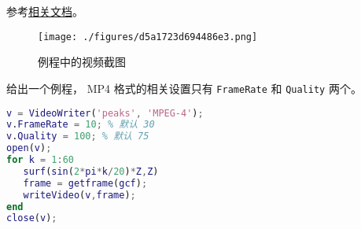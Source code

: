 
\begin{issues}
\issueDraft
\end{issues}


参考\href{https://www.mathworks.com/help/matlab/ref/videowriter.html}{相关文档}。

\begin{figure}[ht]
\centering
\texttt{[image: ./figures/d5a1723d694486e3.png]}
\caption{例程中的视频截图} \label{fig_MatMp4_1}
\end{figure}


给出一个例程， MP4 格式的相关设置只有 \verb`FrameRate` 和 \verb`Quality` 两个。
\begin{lstlisting}[language=matlab, caption=mp4\_demo.m]
% 写 mp4 视频
v = VideoWriter('peaks', 'MPEG-4');
v.FrameRate = 10; % 默认 30
v.Quality = 100; % 默认 75
open(v);
for k = 1:60 
   surf(sin(2*pi*k/20)*Z,Z)
   frame = getframe(gcf);
   writeVideo(v,frame);
end
close(v);
\end{lstlisting}
